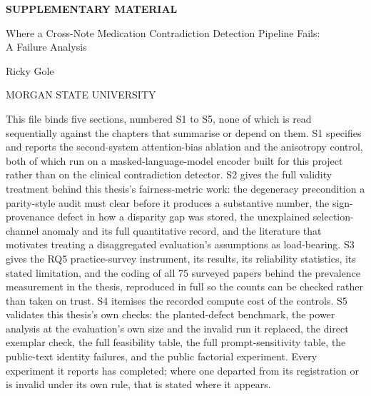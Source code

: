 \documentclass[12pt]{report}
\begin{document}
\thispagestyle{empty}
\vspace*{1.4in}
\begin{center}
  {\normalsize\bfseries SUPPLEMENTARY MATERIAL\par}
  \vspace{0.3in}
  {\normalsize Where a Cross-Note Medication Contradiction Detection Pipeline Fails:\\
   A Failure Analysis\par}
  \vspace{0.3in}
  Ricky Gole\par
  \vspace{0.6in}
  MORGAN STATE UNIVERSITY\par
\end{center}

\vspace{0.8in}
\noindent This file binds five sections, numbered S1 to S5, none of which is
read sequentially against the chapters that summarise or depend on them. S1
specifies and reports the second-system attention-bias ablation and the
anisotropy control, both of which run on a masked-language-model encoder
built for this project rather than on the clinical contradiction detector.
S2 gives the full validity treatment behind this thesis's fairness-metric
work: the degeneracy precondition a parity-style audit must clear before it
produces a substantive number, the sign-provenance defect in how a disparity
gap was stored, the unexplained selection-channel anomaly and its full
quantitative record, and the literature that motivates treating a
disaggregated evaluation's assumptions as load-bearing. S3 gives the RQ5
practice-survey instrument, its results, its reliability statistics, its
stated limitation, and the coding of all 75 surveyed papers behind the
prevalence measurement in the thesis, reproduced in full so the counts can be
checked rather than taken on trust. S4 itemises the recorded compute cost of
the controls. S5 validates this thesis's own checks: the planted-defect
benchmark, the power analysis at the evaluation's own size and the invalid run
it replaced, the direct exemplar check, the full feasibility table, the full
prompt-sensitivity table, the public-text identity failures, and the public
factorial experiment. Every experiment it reports has completed; where one
departed from its registration or is invalid under its own rule, that is
stated where it appears.

\clearpage
{}
\setcounter{page}{1}








\clearpage
{}
\begingroup
\singlespacing
\setlength{\bibhang}{0.5in}
\setlength{\bibitemsep}{0.4\baselineskip}
\printbibliography[heading=bibliography]
\endgroup
\end{document}
